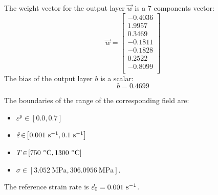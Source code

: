 \documentclass[algorithms,article,submit,pdftex,moreauthors]{Definitions/mdpi}
\DeclareRobustCommand{\mdot}[1]{\accentset{\mbox{\bfseries .}}{#1}}
\DeclareRobustCommand{\ps}{\text{s}^{-1}}
\DeclareRobustCommand{\MPa}{\text{MPa}}
\begin{document}
The weight vector for the output layer $\overrightarrow{w}$ is a 7 components vector:
\begin{equation*}
\overrightarrow{w} = \left[
\begin{array}{r}
-0.4036\\ 
1.9957\\ 
0.3469\\ 
-0.1811\\ 
-0.1828\\ 
0.2522\\ 
-0.8099\\ 
\end{array}\right]
\end{equation*}
The bias of the output layer $b$ is a scalar:
\begin{equation*}
b = 0.4699
\end{equation*}

The boundaries of the range of the corresponding field are:
\begin{itemize}
\item $\varepsilon^p\!\in\!\left[0.0,0.7\right]$
\item $\mdot{\varepsilon}\!\in\!\left[0.001~\ps,0.1~\ps\right]$
\item $T\!\in\!\left[750~\celsius,1300~\celsius\right]$ 
\item $\sigma\!\in\!\left[3.052~\MPa,306.0956~\MPa\right]$.
\end{itemize} 
The reference strain rate is $\mdot{\varepsilon_0} = 0.001~\ps$.

%


\end{document}
